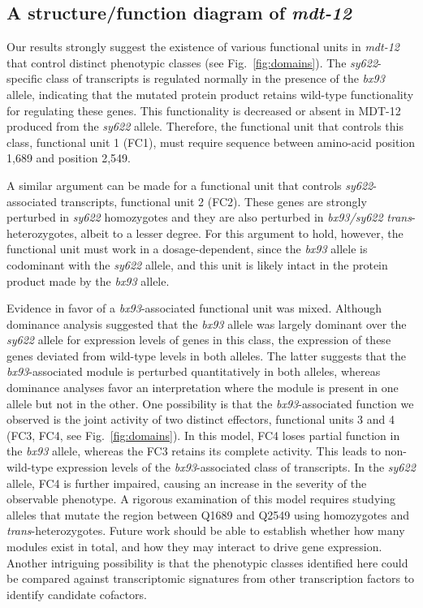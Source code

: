 \documentclass[10pt, twocolumn]{article}
\newcommand{\gene}[1]{\mbox{\emph{#1}}}
\newcommand{\protein}[1]{\mbox{\uppercase{#1}}}
\newcommand{\dpy}{\gene{mdt-12}}
\begin{document}
\subsection*{A structure/function diagram of \dpy{}}
Our results strongly suggest the existence of various functional units in \dpy{}
that control distinct phenotypic classes (see Fig.~\ref{fig:domains}). The
\emph{sy622}-specific class of transcripts is regulated normally in the presence
of the \emph{bx93} allele, indicating that the mutated protein product retains
wild-type functionality for regulating these genes. This functionality is
decreased or absent in \protein{mdt-12} produced from the \emph{sy622} allele.
Therefore, the functional unit that controls this class, functional unit 1 (FC1),
must require sequence between amino-acid position 1,689 and position 2,549.

A similar argument can be made for a functional unit that controls \emph{sy622}-associated
transcripts, functional unit 2 (FC2). These genes are strongly perturbed in
\emph{sy622} homozygotes and they are also perturbed in \emph{bx93/sy622}
\emph{trans}-heterozygotes, albeit to a lesser degree. For this argument to
hold, however, the functional unit must work in a dosage-dependent, since the
\emph{bx93} allele is codominant with the \emph{sy622} allele, and this unit is
likely intact in the protein product made by the \emph{bx93} allele.

Evidence in favor of a \emph{bx93}-associated functional unit was mixed.
Although dominance analysis suggested that the \emph{bx93} allele was largely
dominant over the \emph{sy622} allele for expression levels of genes in this
class, the expression of these genes deviated from wild-type levels in both
alleles. The latter suggests that the \emph{bx93}-associated module is perturbed
quantitatively in both alleles, whereas dominance analyses favor an
interpretation where the module is present in one allele but not in the other.
One possibility is that the \emph{bx93}-associated function we observed is the
joint activity of two distinct effectors, functional units 3 and 4 (FC3, FC4,
see Fig.~\ref{fig:domains}). In this model, FC4 loses partial function in the
\emph{bx93} allele, whereas the FC3 retains its complete activity. This leads to
non-wild-type expression levels of the \emph{bx93}-associated class of
transcripts. In the \emph{sy622} allele, FC4 is further impaired, causing an
increase in the severity of the observable phenotype. A rigorous examination of
this model requires studying alleles that mutate the region between Q1689 and
Q2549 using homozygotes and \emph{trans}-heterozygotes. Future work should be
able to establish whether how many modules exist in total, and how they may
interact to drive gene expression. Another intriguing possibility is that the
phenotypic classes identified here could be compared against transcriptomic
signatures from other transcription factors to identify candidate cofactors.
\end{document}
